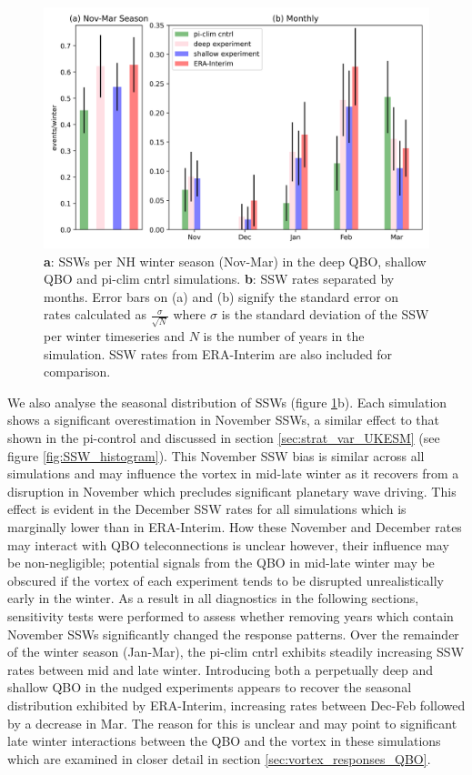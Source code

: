 \begin{figure}[h!]
\begin{center}
\noindent\includegraphics[width = 0.8\linewidth]{Figures/Figures-deepQBO/SSW_hist.png}
\caption[SSWs per NH winter season in QBO experiments]{\textbf{a}: SSWs per NH winter season (Nov-Mar) in the deep QBO, shallow QBO and pi-clim cntrl simulations. \textbf{b}: SSW rates separated by months. Error bars on (a) and (b) signify the standard error on rates calculated as $\frac{\sigma}{\sqrt{N}}$ where $\sigma$ is the standard deviation of the SSW per winter timeseries and $N$ is the number of years in the simulation. SSW rates from ERA-Interim are also included for comparison.}
\label{fig:SSW_histogram_experiments}
\end{center}
\end{figure}

We also analyse the seasonal distribution of SSWs (figure \ref{fig:SSW_histogram_experiments}b). Each simulation shows a significant overestimation in November SSWs, a similar effect to that shown in the pi-control and discussed in section \ref{sec:strat_var_UKESM} (see figure \ref{fig:SSW_histogram}). This November SSW bias is similar across all simulations and may influence the vortex in mid-late winter as it recovers from a disruption in November which precludes significant planetary wave driving. This effect is evident in the December SSW rates for all simulations which is marginally lower than in ERA-Interim. How these November and December rates may interact with QBO teleconnections is unclear however, their influence may be non-negligible; potential signals from the QBO in mid-late winter may be obscured if the vortex of each experiment tends to be disrupted unrealistically early in the winter. As a result in all diagnostics in the following sections, sensitivity tests were performed to assess whether removing years which contain November SSWs significantly changed the response patterns. Over the remainder of the winter season (Jan-Mar), the pi-clim cntrl exhibits steadily increasing SSW rates between mid and late winter. Introducing both a perpetually deep and shallow QBO in the nudged experiments appears to recover the seasonal distribution exhibited by ERA-Interim, increasing rates between Dec-Feb followed by a decrease in Mar. The reason for this is unclear and may point to significant late winter interactions between the QBO and the vortex in these simulations which are examined in closer detail in section \ref{sec:vortex_responses_QBO}.

